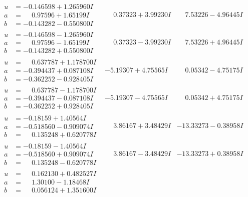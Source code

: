 \documentclass[1p]{elsarticle_modified}
\theoremstyle{definition}
\begin{document}
$$\begin{array}{c|c|c}
\begin{aligned}
u &= -0.146598 + 1.265960 I \\
a &= \phantom{-}0.97596 + 1.65199 I \\
b &= -0.143282 - 0.550800 I\end{aligned}
 & \phantom{-}0.37323 + 3.99230 I & \phantom{-}7.53226 - 4.96445 I \\ \hline\begin{aligned}
u &= -0.146598 - 1.265960 I \\
a &= \phantom{-}0.97596 - 1.65199 I \\
b &= -0.143282 + 0.550800 I\end{aligned}
 & \phantom{-}0.37323 - 3.99230 I & \phantom{-}7.53226 + 4.96445 I \\ \hline\begin{aligned}
u &= \phantom{-}0.637787 + 1.178700 I \\
a &= -0.394437 + 0.087108 I \\
b &= -0.362252 - 0.928405 I\end{aligned}
 & -5.19307 + 4.75565 I & \phantom{-}0.05342 - 4.75175 I \\ \hline\begin{aligned}
u &= \phantom{-}0.637787 - 1.178700 I \\
a &= -0.394437 - 0.087108 I \\
b &= -0.362252 + 0.928405 I\end{aligned}
 & -5.19307 - 4.75565 I & \phantom{-}0.05342 + 4.75175 I \\ \hline\begin{aligned}
u &= -0.18159 + 1.40564 I \\
a &= -0.518560 - 0.909074 I \\
b &= \phantom{-}0.135248 + 0.620778 I\end{aligned}
 & \phantom{-}3.86167 + 3.48429 I & -13.33273 - 0.38958 I \\ \hline\begin{aligned}
u &= -0.18159 - 1.40564 I \\
a &= -0.518560 + 0.909074 I \\
b &= \phantom{-}0.135248 - 0.620778 I\end{aligned}
 & \phantom{-}3.86167 - 3.48429 I & -13.33273 + 0.38958 I \\ \hline\begin{aligned}
u &= \phantom{-}0.162130 + 0.482527 I \\
a &= \phantom{-}1.30100 - 1.18468 I \\
b &= \phantom{-}0.056124 + 1.351600 I\end{aligned}

\end{array}$$
\end{document}
